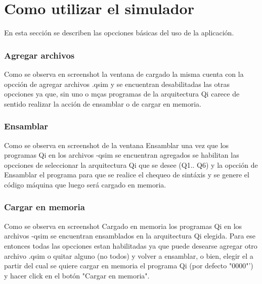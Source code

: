 \section{Como utilizar el simulador}

En esta sección se describen las opcciones básicas del uso de la aplicación.

\subsubsection{Agregar archivos}
Como se observa en screenshot la ventana de cargado la misma cuenta con la opcción de agregar archivos .qsim y se encuentran desabilitadas las otras opcciones ya que, sin uno o mças programas de la arquitectura Qi carece de sentido realizar la acción de ensamblar o de cargar en memoria.

\subsubsection{Ensamblar}
Como se observa en screenshot de la ventana Ensamblar una vez que los programas Qi en los archivos -qsim se encuentran agregados se habilitan las opcciones de seleccionar la arquitectura Qi que se desee (Q1.. Q6) y la opcción de Ensamblar el programa para que se realice el chequeo de sintáxis y se genere el código máquina que luego será cargado en memoria.


\subsubsection{Cargar en memoria}
Como se observa en screenshot Cargado en memoria los programas Qi en los archivos -qsim se encuentran ensamblados en la arquitectura Qi elegida.
Para ese entonces todas las opcciones estan habilitadas ya que puede desearse agregar otro archivo .qsim o quitar alguno (no todos) y volver a ensamblar, o bien, elegir el \PC a partir del cual se quiere cargar en memoria el programa Qi (por defecto "0000"') y hacer click en el botón "Cargar en memoria".

